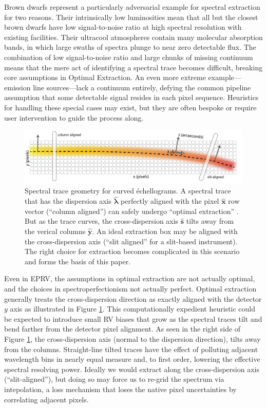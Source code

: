 \documentclass[twocolumn]{aastex631}
\begin{document}
Brown dwarfs represent a particularly adversarial example for spectral extraction for two reasons.  Their intrinsically low luminosities mean that all but the closest brown dwarfs have low signal-to-noise ratio at high spectral resolution with existing facilities.  Their ultracool atmospheres contain many molecular absorption bands, in which large swaths of spectra plunge to near zero detectable flux.  The combination of low signal-to-noise ratio and large chunks of missing continuum means that the mere act of identifying a spectral trace becomes difficult, breaking core assumptions in Optimal Extraction.  An even more extreme example---emission line sources---lack a continuum entirely, defying the common pipeline assumption that some detectable signal resides in each pixel sequence.  Heuristics for handling these special cases may exist, but they are often bespoke or require user intervention to guide the process along.

\begin{figure}[t!]
  \centering
  \includegraphics[width=0.98\linewidth]{figures/spectral_trace_v0p1rot.png}
  \caption{Spectral trace geometry for curved \'echellograms.  A spectral trace that has the dispersion axis $\hat{\boldsymbol{\lambda}}$ perfectly aligned with the pixel $\hat{\boldsymbol{x}}$ row vector (``column aligned'') can safely undergo ``optimal extraction'' \citep{1986PASP...98..609H}.  But as the trace curves, the cross-dispersion axis $\hat{\boldsymbol{s}}$ tilts away from the verical columns $\hat{\boldsymbol{y}}$.  An ideal extraction box may be aligned with the cross-dispersion axis (``slit aligned'' for a slit-based instrument).  The right choice for extraction becomes complicated in this scenario and forms the basis of this paper.}
  \label{fig:traceSchematic}
\end{figure}


Even in EPRV, the assumptions in optimal extraction are not actually optimal, and the choices in spectroperfectionism not actually perfect.  Optimal extraction generally treats the cross-dispersion direction as exactly aligned with the detector $y$ axis as illustrated in Figure \ref{fig:traceSchematic}. This computationally expedient heuristic could be expected to introduce small RV biases that grow as the spectral traces tilt and bend farther from the detector pixel alignment.  As seen in the right side of Figure \ref{fig:traceSchematic}, the cross-dispersion axis (normal to the dispersion direction), tilts away from the columns. Straight-line tilted traces have the effect of polluting adjacent wavelength bins in nearly equal measure and, to first order, lowering the effective spectral resolving power.  Ideally we would extract along the cross-dispersion axis (``slit-aligned''), but doing so may force us to re-grid the spectrum via intepolation, a loss mechanism that loses the native pixel uncertainties by correlating adjacent pixels.
\end{document}
